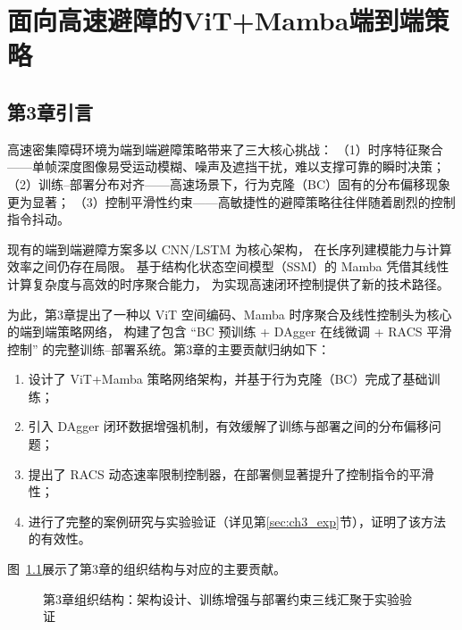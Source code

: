 \chapter{面向高速避障的ViT+Mamba端到端策略}

\section{第3章引言}

高速密集障碍环境为端到端避障策略带来了三大核心挑战：
（1）时序特征聚合——单帧深度图像易受运动模糊、噪声及遮挡干扰，难以支撑可靠的瞬时决策；
（2）训练--部署分布对齐——高速场景下，行为克隆（BC）固有的分布偏移现象更为显著；
（3）控制平滑性约束——高敏捷性的避障策略往往伴随着剧烈的控制指令抖动。

现有的端到端避障方案多以 CNN/LSTM 为核心架构\cite{Loquercio2021HighSpeedWild}，
在长序列建模能力与计算效率之间仍存在局限。
基于结构化状态空间模型（SSM）的 Mamba\cite{Gu2023Mamba} 凭借其线性计算复杂度与高效的时序聚合能力，
为实现高速闭环控制提供了新的技术路径。

为此，第3章提出了一种以 ViT 空间编码、Mamba 时序聚合及线性控制头为核心的端到端策略网络，
构建了包含 ``BC 预训练 + DAgger 在线微调 + RACS 平滑控制'' 的完整训练--部署系统。第3章的主要贡献归纳如下：

\begin{enumerate}
    \item 设计了 ViT+Mamba 策略网络架构，并基于行为克隆（BC）完成了基础训练；
    \item 引入 DAgger 闭环数据增强机制，有效缓解了训练与部署之间的分布偏移问题；
    \item 提出了 RACS 动态速率限制控制器，在部署侧显著提升了控制指令的平滑性；
    \item 进行了完整的案例研究与实验验证（详见第\ref{sec:ch3_exp}节），证明了该方法的有效性。
\end{enumerate}

图~\ref{fig:ch3_structure}展示了第3章的组织结构与对应的主要贡献。

\begin{figure}[htbp]
\centering
{}
\caption{第3章组织结构：架构设计、训练增强与部署约束三线汇聚于实验验证}
\label{fig:ch3_structure}
\end{figure}



